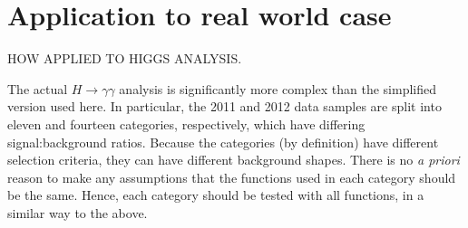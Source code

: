 
\section{Application to real world case}
\label{sec:discussion}
\label{sec:discussion:higgs}

HOW APPLIED TO HIGGS ANALYSIS.

The actual $H \rightarrow \gamma\gamma$ analysis is significantly more
complex than the simplified version used here. In particular, the 2011 
and 2012 data
samples are split into eleven and fourteen categories, respectively, which have
differing signal:background ratios.
Because the categories (by definition) have different selection criteria,
they can have different background shapes.
There is no {\it a priori} reason to make any assumptions that the functions
used in each category should be the same. Hence, each category should be
tested with all functions, in a similar way to the above.

